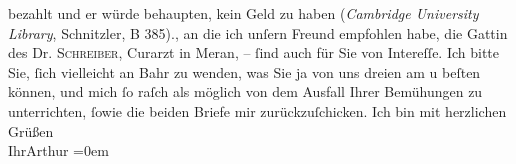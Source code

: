 \begin{ledgroupsized}[t]{13cm}
{{{                        bezahlt und er würde behaupten, kein Geld zu haben (\emph{Cambridge University Library}, Schnitzler, B 385).}}}\label{K_L00199_2h}, an die ich
                    unſern Freund empfohlen habe, die Gattin des Dr. \textsc{Schreiber}, Curarzt in Meran, – ſind auch
                    für Sie von Intereſſe. Ich bitte Sie, ſich vielleicht an Bahr zu wenden, was Sie ja von uns dreien am
                        \label{K_L00199_3v}\label{K_L00199_3h} u beſten können, {\pb}und mich ſo raſch als möglich von dem Ausfall
                    Ihrer Bemühungen zu unterrichten, ſowie die beiden Briefe mir
                    zurückzuſchicken.\pend
           \pstart
           Ich bin mit herzlichen Grüßen{\\[\baselineskip]}Ihr\spacefill\mbox{Arthur}\pend
           \leftskip=0em{}\endnumbering{}\end{ledgroupsized}  \newcommand{\dateiname}{L00199}\newcommand{\titel}{Arthur Schnitzler an Hugo von Hofmannsthal, [21. 4. 1893?]}\newcommand{\editorInnen}{ Martin Anton Müller und Gerd-Hermann Susen}
      